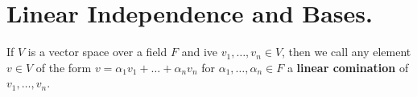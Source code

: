 
\section{Linear Independence and Bases.}
\label{section1}
 \begin{definition}
     If $V$ is a vector space over a field  $F$ and ive  $ v_1, \dots,v_n \in
     V$, then we call any element $v \in V$ of the form $v=\alpha_1v_1+\dots+\alpha_n 
     v_n$ for $\alpha_1, \dots, \alpha_n \in F$ a \textbf{linear comination} 
     of $ v_1, \dots, v_n$.
 \end{definition}
